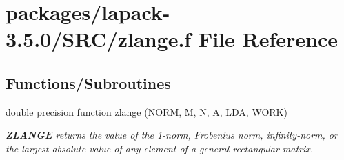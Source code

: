 \hypertarget{zlange_8f}{}\section{packages/lapack-\/3.5.0/\+S\+R\+C/zlange.f File Reference}
\label{zlange_8f}
\subsection*{Functions/\+Subroutines}
\begin{DoxyCompactItemize}
\item 
double \hyperlink{numinquire_8h_a2c8e616467665d0b2814d4c1589ba74e}{precision} \hyperlink{afunc_8m_a7b5e596df91eadea6c537c0825e894a7}{function} \hyperlink{group__complex16GEauxiliary_ga7908bb12a6f02dbfa4d5a92a27c0e9b7}{zlange} (N\+O\+R\+M, M, \hyperlink{polmisc_8c_a0240ac851181b84ac374872dc5434ee4}{N}, \hyperlink{classA}{A}, \hyperlink{example__user_8c_ae946da542ce0db94dced19b2ecefd1aa}{L\+D\+A}, W\+O\+R\+K)
\begin{DoxyCompactList}\small\item\em {\bfseries Z\+L\+A\+N\+G\+E} returns the value of the 1-\/norm, Frobenius norm, infinity-\/norm, or the largest absolute value of any element of a general rectangular matrix. \end{DoxyCompactList}\end{DoxyCompactItemize}
